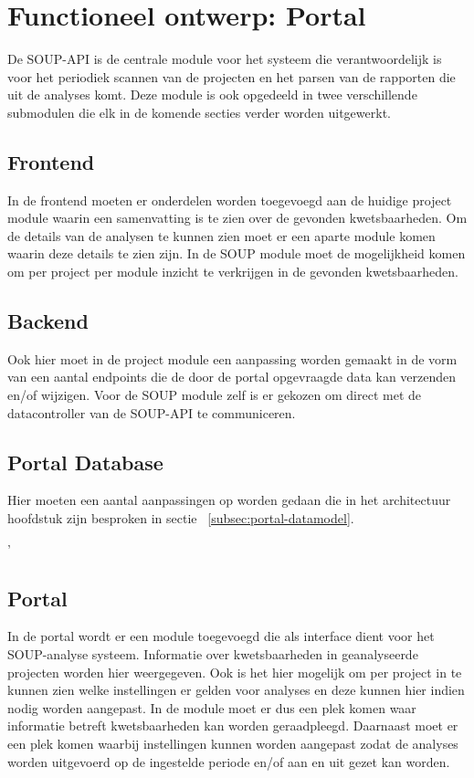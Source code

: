 \chapter{Functioneel ontwerp: Portal}\label{ch:impl-Portal}
De SOUP-API is de centrale module voor het systeem die verantwoordelijk is voor het periodiek scannen van de projecten en het parsen van de rapporten die uit de analyses komt. Deze module is ook opgedeeld in twee verschillende submodulen die elk in de komende secties verder worden uitgewerkt.


\section{Frontend}
In de frontend moeten er onderdelen worden toegevoegd aan de huidige project module waarin een samenvatting is te zien over de gevonden kwetsbaarheden. Om de details van de analysen te kunnen zien moet er een aparte module komen waarin deze details te zien zijn. In de SOUP module moet de mogelijkheid komen om per project per module inzicht te verkrijgen in de gevonden kwetsbaarheden.


\section{Backend}
Ook hier moet in de project module een aanpassing worden gemaakt in de vorm van een aantal endpoints die de door de portal opgevraagde data kan verzenden en/of wijzigen. Voor de SOUP module zelf is er gekozen om direct met de datacontroller van de SOUP-API te communiceren.

\section{Portal Database}
Hier moeten een aantal aanpassingen op worden gedaan die in het architectuur hoofdstuk zijn besproken in sectie ~\ref{subsec:portal-datamodel}.

'


\section{Portal}\label{sec:portal}
In de portal wordt er een module toegevoegd die als interface dient voor het SOUP-analyse systeem. Informatie over kwetsbaarheden in geanalyseerde projecten worden hier weergegeven. Ook is het hier mogelijk om per project in te kunnen zien welke instellingen er gelden voor analyses en deze kunnen hier indien nodig worden aangepast.
In de module moet er dus een plek komen waar informatie betreft kwetsbaarheden kan worden geraadpleegd. Daarnaast moet er een plek komen waarbij instellingen kunnen worden aangepast zodat de analyses worden uitgevoerd op de ingestelde periode en/of aan en uit gezet kan worden.
